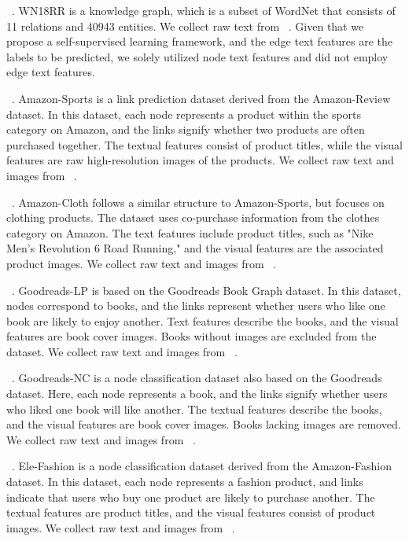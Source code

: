 ~\cite{liu2023one}. WN18RR is a knowledge graph, which is a subset of WordNet that consists of 11 relations and 40943 entities.
We collect raw text from ~\cite{liu2023one}. Given that we propose a self-supervised learning framework, and the edge text features are the labels to be predicted, we solely utilized node text features and did not employ edge text features.

~\cite{zhu2024multimodal}. Amazon-Sports is a link prediction dataset derived from the Amazon-Review dataset. In this dataset, each node represents a product within the sports category on Amazon, and the links signify whether two products are often purchased together. The textual features consist of product titles, while the visual features are raw high-resolution images of the products. We collect raw text and images from ~\cite{zhu2024multimodal}.

~\cite{zhu2024multimodal}. Amazon-Cloth follows a similar structure to Amazon-Sports, but focuses on clothing products. The dataset uses co-purchase information from the clothes category on Amazon. The text features include product titles, such as "Nike Men's Revolution 6 Road Running," and the visual features are the associated product images. We collect raw text and images from ~\cite{zhu2024multimodal}.

~\cite{zhu2024multimodal}. Goodreads-LP is based on the Goodreads Book Graph dataset. In this dataset, nodes correspond to books, and the links represent whether users who like one book are likely to enjoy another. Text features describe the books, and the visual features are book cover images. Books without images are excluded from the dataset. We collect raw text and images from ~\cite{zhu2024multimodal}.

~\cite{zhu2024multimodal}. Goodreads-NC is a node classification dataset also based on the Goodreads dataset. Here, each node represents a book, and the links signify whether users who liked one book will like another. The textual features describe the books, and the visual features are book cover images. Books lacking images are removed. We collect raw text and images from ~\cite{zhu2024multimodal}.

~\cite{zhu2024multimodal}. Ele-Fashion is a node classification dataset derived from the Amazon-Fashion dataset. In this dataset, each node represents a fashion product, and links indicate that users who buy one product are likely to purchase another. The textual features are product titles, and the visual features consist of product images. We collect raw text and images from ~\cite{zhu2024multimodal}.


